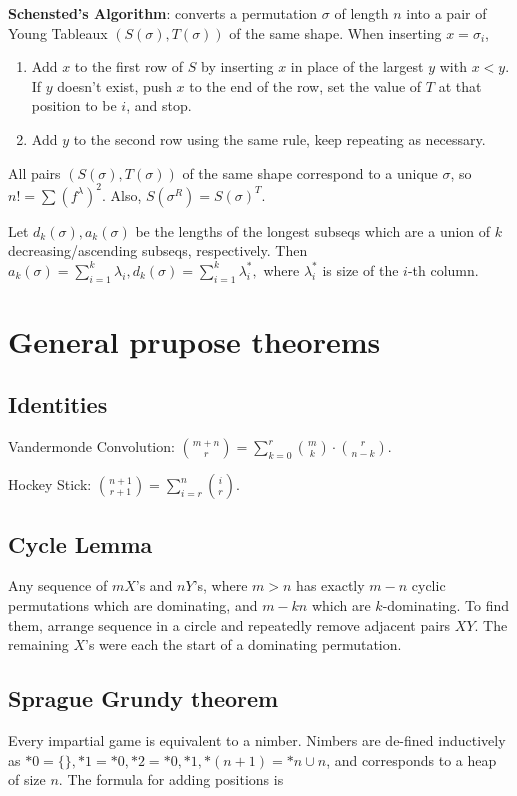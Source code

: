 	\textbf{Schensted's Algorithm}: converts a permutation $\sigma$ of length $n$ into a pair of Young Tableaux $(S(\sigma),T(\sigma))$ of the same shape. When inserting $x=\sigma_i$,

	\begin{enumerate}
	\item Add $x$ to the first row of $S$ by inserting $x$ in place of the largest $y$ with $x<y$. If $y$ doesn't exist, push $x$ to the end of the row, set the value of $T$ at that position to be $i$, and stop.
	\item Add $y$ to the second row using the same rule, keep repeating as necessary.
	\end{enumerate}

	All pairs $(S(\sigma),T(\sigma))$ of the same shape correspond to a unique $\sigma$, so
	$n!=\sum (f^{\lambda})^2.$ Also, $S(\sigma^R)=S(\sigma)^T.$

	Let $d_k(\sigma),a_k(\sigma)$ be the lengths of the longest subseqs which are a union of $k$ decreasing/ascending subseqs, respectively. Then $a_k(\sigma)=\sum_{i=1}^k\lambda_i, d_k(\sigma)=\sum_{i=1}^k\lambda^*_i,$ where $\lambda^*_i$ is size of the $i$-th column. 

\section{General prupose theorems}

	\subsection{Identities}
	Vandermonde Convolution: $\binom{m+n}{r} = \sum_{k=0}^r\binom{m}{k}\cdot\binom{r}{n-k}$.

	Hockey Stick: $\binom{n+1}{r+1} = \sum_{i=r}^n\binom{i}{r}$.

	\subsection{Cycle Lemma}
	Any sequence of $m X$'s and $n Y$'s, where $m > n$ has exactly $m -n$ cyclic permutations which are dominating,
	and $m - kn$ which are $k$-dominating. To find them, arrange sequence in a circle and repeatedly remove
	adjacent pairs $XY$. The remaining $X$'s were each the start of a dominating permutation.

	\subsection{Sprague Grundy theorem}
	Every impartial game is equivalent to a nimber. Nimbers are de-fined inductively as $*0 = \{\}, *1 = {*0}, *2 = {*0, *1}, *(n+1) = *n \cup {n}$, and
	corresponds to a heap of size $n$. The formula for adding positions is 

